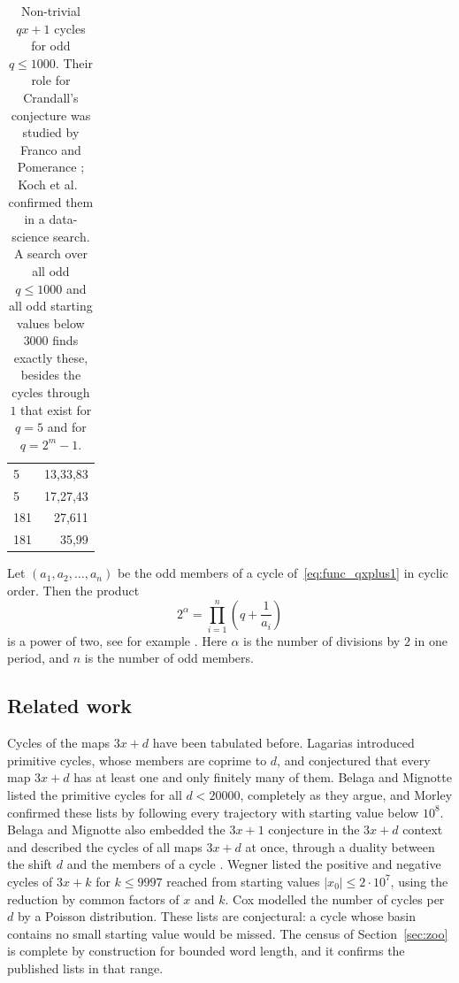 \documentclass[12pt]{amsart}
\theoremstyle{definition}
\theoremstyle{remark}
\begin{document}
\begin{table}[H]
	\centering
	\begin{tabular}{|L|R|}
		\hline
		 &
		 \\
		 &
		13,33,83 \\
		5 &
		17,27,43 \\
		181 &
		27,611 \\
		181 &
		35,99 \\
		\hline
	\end{tabular}
	\caption{Non-trivial $qx+1$ cycles for odd $q\leq1000$. Their role for Crandall's conjecture was studied by Franco and Pomerance \cite{Franco_Pomerance_1995}; Koch et al.\ \cite{Koch_2020} confirmed them in a data-science search. A search over all odd $q\le1000$ and all odd starting values below $3000$ finds exactly these, besides the cycles through $1$ that exist for $q=5$ and for $q=2^m-1$.}
	\label{table:known_cycles}
\end{table}

Let $(a_1,a_2,\ldots,a_n)$ be the odd members of a cycle of~\eqref{eq:func_qxplus1} in cyclic order. Then the product
\begin{equation}
\label{eq:condition_cycle_existance}
2^\alpha=\prod_{i=1}^{n}\left(q+\frac{1}{a_i}\right)
\end{equation}
is a power of two, see for example \cite[p.~327]{Lagarias_2010}. Here $\alpha$ is the number of divisions by $2$ in one period, and $n$ is the number of odd members.

\subsection*{Related work}
Cycles of the maps $3x+d$ have been tabulated before. Lagarias \cite{Lagarias_1990} introduced primitive cycles, whose members are coprime to $d$, and conjectured that every map $3x+d$ has at least one and only finitely many of them. Belaga and Mignotte \cite{Belaga_Mignotte_2000,Belaga_Mignotte_2006} listed the primitive cycles for all $d<20000$, completely as they argue, and Morley \cite{OEIS_A226607} confirmed these lists by following every trajectory with starting value below $10^8$. Belaga and Mignotte also embedded the $3x+1$ conjecture in the $3x+d$ context \cite{Belaga_Mignotte_1998} and described the cycles of all maps $3x+d$ at once, through a duality between the shift $d$ and the members of a cycle \cite{Belaga_Mignotte_DMTCS_2006}. Wegner \cite{Wegner_2021} listed the positive and negative cycles of $3x+k$ for $k\le9997$ reached from starting values $|x_0|\le2\cdot10^7$, using the reduction by common factors of $x$ and $k$. Cox \cite{Cox_2012} modelled the number of cycles per $d$ by a Poisson distribution. These lists are conjectural: a cycle whose basin contains no small starting value would be missed. The census of Section~\ref{sec:zoo} is complete by construction for bounded word length, and it confirms the published lists in that range.
\end{document}
